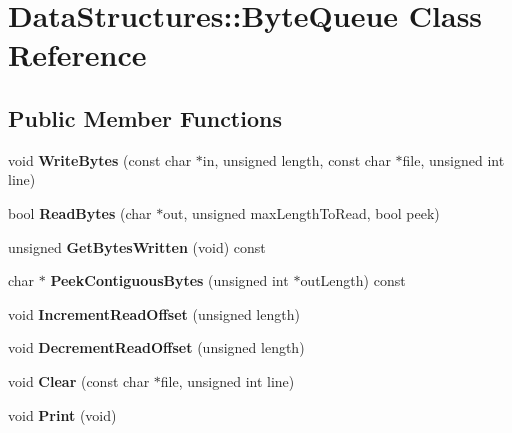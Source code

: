 \hypertarget{class_data_structures_1_1_byte_queue}{\section{Data\-Structures\-:\-:Byte\-Queue Class Reference}
\label{class_data_structures_1_1_byte_queue}
}
\subsection*{Public Member Functions}
\begin{DoxyCompactItemize}
\item 
\hypertarget{class_data_structures_1_1_byte_queue_a8d5ce51f58100d15c242c525374d7e8d}{void {\bfseries Write\-Bytes} (const char $\ast$in, unsigned length, const char $\ast$file, unsigned int line)}\label{class_data_structures_1_1_byte_queue_a8d5ce51f58100d15c242c525374d7e8d}

\item 
\hypertarget{class_data_structures_1_1_byte_queue_a209bf3fc7fc1a406b1e777d61db8cdf3}{bool {\bfseries Read\-Bytes} (char $\ast$out, unsigned max\-Length\-To\-Read, bool peek)}\label{class_data_structures_1_1_byte_queue_a209bf3fc7fc1a406b1e777d61db8cdf3}

\item 
\hypertarget{class_data_structures_1_1_byte_queue_af4adf306cae7459c91aaf44f53943055}{unsigned {\bfseries Get\-Bytes\-Written} (void) const }\label{class_data_structures_1_1_byte_queue_af4adf306cae7459c91aaf44f53943055}

\item 
\hypertarget{class_data_structures_1_1_byte_queue_af61e26d49531f2756795ee427f8a01bf}{char $\ast$ {\bfseries Peek\-Contiguous\-Bytes} (unsigned int $\ast$out\-Length) const }\label{class_data_structures_1_1_byte_queue_af61e26d49531f2756795ee427f8a01bf}

\item 
\hypertarget{class_data_structures_1_1_byte_queue_a105661bc051da106c8a2cfa18534b2bf}{void {\bfseries Increment\-Read\-Offset} (unsigned length)}\label{class_data_structures_1_1_byte_queue_a105661bc051da106c8a2cfa18534b2bf}

\item 
\hypertarget{class_data_structures_1_1_byte_queue_a1b73bb901bbf124769beb0f0241aa1d0}{void {\bfseries Decrement\-Read\-Offset} (unsigned length)}\label{class_data_structures_1_1_byte_queue_a1b73bb901bbf124769beb0f0241aa1d0}

\item 
\hypertarget{class_data_structures_1_1_byte_queue_a0be0b907020e6ba3e22a05ba976fb124}{void {\bfseries Clear} (const char $\ast$file, unsigned int line)}\label{class_data_structures_1_1_byte_queue_a0be0b907020e6ba3e22a05ba976fb124}

\item 
\hypertarget{class_data_structures_1_1_byte_queue_a2ca8e73bd29717c0503f5b6d159ef452}{void {\bfseries Print} (void)}\label{class_data_structures_1_1_byte_queue_a2ca8e73bd29717c0503f5b6d159ef452}

\end{DoxyCompactItemize}
